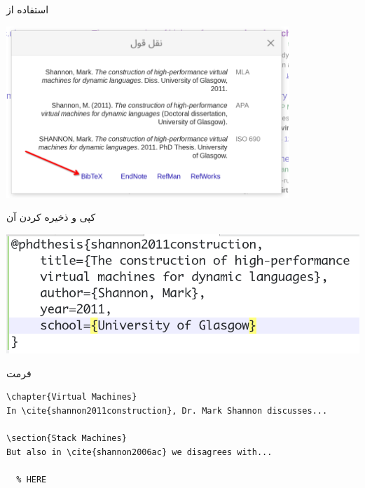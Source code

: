 \begin{frame}{استفاده از }
\begin{center}
\includegraphics[width=0.8\textwidth, height=0.8\textheight]{docs/images/bibtex}
\end{center}
\end{frame}

\begin{frame}{کپی و ذخیره‌ کردن آن}
\begin{center}
\includegraphics[width=\textwidth]{docs/images/copy-save}
\end{center}
\end{frame}

\begin{frame}[fragile]{فرمت }
\begin{latin}
\begin{lstlisting}[keywords={chapter, section, label, ref}, keywordstyle=\color{Mulberry}\textbf]
\chapter{Virtual Machines}
In \cite{shannon2011construction}, Dr. Mark Shannon discusses...

\section{Stack Machines}
But also in \cite{shannon2006ac} we disagrees with...

  % HERE

\end{lstlisting}
\end{latin}
\end{frame}

